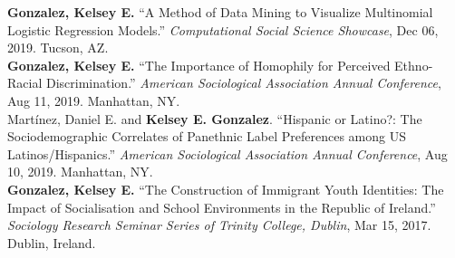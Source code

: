 \textbf{Gonzalez, Kelsey E.} 
``A Method of Data Mining to Visualize Multinomial Logistic Regression Models.''
\emph{Computational Social Science Showcase}, Dec 06, 2019. Tucson, AZ.\\


\years{}
\textbf{Gonzalez, Kelsey E.} 
``The Importance of Homophily for Perceived Ethno-Racial Discrimination.'' 
\emph{American Sociological Association Annual Conference}, Aug 11, 2019. Manhattan, NY.\\


\years{}
Martínez, Daniel E. and \textbf{Kelsey E. Gonzalez}. 
``Hispanic or Latino?: The Sociodemographic Correlates of Panethnic Label Preferences among US Latinos/Hispanics.'' 
\emph{American Sociological Association Annual Conference}, Aug 10, 2019. Manhattan, NY. \\

 \textbf{Gonzalez, Kelsey E.} 
``The Construction of Immigrant Youth Identities: The Impact of Socialisation and School Environments in the Republic of Ireland.'' \emph{Sociology Research Seminar Series of Trinity College, Dublin}, Mar 15, 2017. Dublin, Ireland.\\




\begin{comment}
    \years{2013} \textbf{Gonzalez, Kelsey E.} 
    ``Life Without Water: The Border Dispute between Chile, Bolivia and Peru.'' \emph{Borders, Boundaries, and Peace Undergraduate Research Conference}. Feb 28, 2013. Milwaukee, WI.
\end{comment}



\begin{comment}


\end{comment}



\begin{comment}
\subsection{Conference Panel Organization, Moderation and Commentary}
\years{2020} Presider of the "" Table. Section on . \emph{American Sociological Association Annual Conference}, Aug 08-11. San Francisco, CA.\\

\years{2020} Organizer of the "Data Ethics \& Bias" Panel. \emph{Women in Data Science Tucson Regional Event}, April 17. Tucson, AZ.\\
\end{comment}
